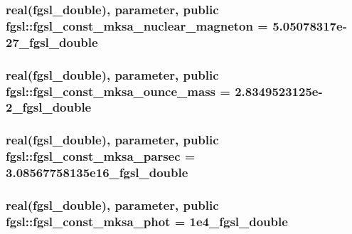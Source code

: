 \subsubsection[{fgsl\+\_\+const\+\_\+mksa\+\_\+nuclear\+\_\+magneton}]{\setlength{\rightskip}{0pt plus 5cm}real({\bf fgsl\+\_\+double}), parameter, public fgsl\+::fgsl\+\_\+const\+\_\+mksa\+\_\+nuclear\+\_\+magneton = 5.\+05078317e-\/27\+\_\+fgsl\+\_\+double}\label{namespacefgsl_a01a0e11a78d0097f8c8a170dbea03e3f}
\hypertarget{namespacefgsl_ad41b90538ca94b0ba552ed733d732c4b}{}
\subsubsection[{fgsl\+\_\+const\+\_\+mksa\+\_\+ounce\+\_\+mass}]{\setlength{\rightskip}{0pt plus 5cm}real({\bf fgsl\+\_\+double}), parameter, public fgsl\+::fgsl\+\_\+const\+\_\+mksa\+\_\+ounce\+\_\+mass = 2.\+8349523125e-\/2\+\_\+fgsl\+\_\+double}\label{namespacefgsl_ad41b90538ca94b0ba552ed733d732c4b}
\hypertarget{namespacefgsl_ab701318a50ffa3b0b31f26f7882a2b16}{}
\subsubsection[{fgsl\+\_\+const\+\_\+mksa\+\_\+parsec}]{\setlength{\rightskip}{0pt plus 5cm}real({\bf fgsl\+\_\+double}), parameter, public fgsl\+::fgsl\+\_\+const\+\_\+mksa\+\_\+parsec = 3.\+08567758135e16\+\_\+fgsl\+\_\+double}\label{namespacefgsl_ab701318a50ffa3b0b31f26f7882a2b16}
\hypertarget{namespacefgsl_aa7384fc174d5954073075ac6e8117789}{}
\subsubsection[{fgsl\+\_\+const\+\_\+mksa\+\_\+phot}]{\setlength{\rightskip}{0pt plus 5cm}real({\bf fgsl\+\_\+double}), parameter, public fgsl\+::fgsl\+\_\+const\+\_\+mksa\+\_\+phot = 1e4\+\_\+fgsl\+\_\+double}\label{namespacefgsl_aa7384fc174d5954073075ac6e8117789}
\hypertarget{namespacefgsl_a11b62fc3ced19e2c4f1ad227de09f9f0}{}
